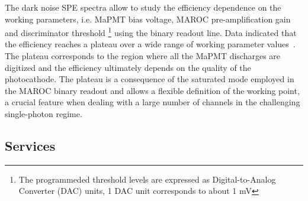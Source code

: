 \documentclass[5p,times,twocolumn]{elsarticle}
\begin{document}
The dark noise SPE spectra allow to study the efficiency dependence on the working parameters, i.e. MaPMT bias voltage, MAROC pre-amplification gain and discriminator threshold \footnote{The programmeded threshold levels are expressed as Digital-to-Analog Converter (DAC) units, 1 DAC unit corresponds to about 1 mV} using the binary readout line. 
Data indicated that the efficiency reaches a plateau over a wide range of working parameter values~\cite{Ref:RICHElectro}. %
The plateau corresponds to the region where all the MaPMT discharges  are digitized and the efficiency ultimately depends on the quality of the photocathode. The plateau is a consequence of the saturated mode employed in the MAROC binary readout and allows a flexible definition of the working point, a crucial feature when dealing with a large number of channels in the challenging single-photon regime.



\subsection{Services}
\end{document}
